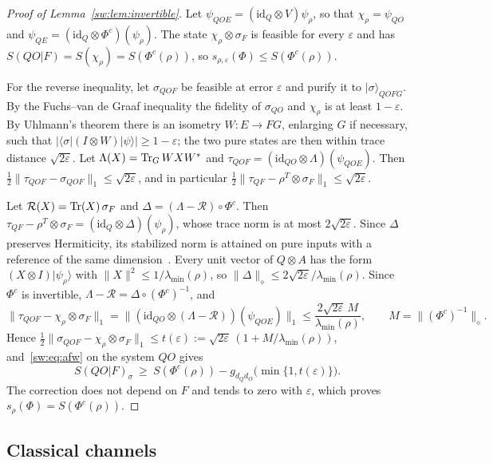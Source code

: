 \begin{proof}[Proof of Lemma~\ref{sw:lem:invertible}]
Let $\psi_{QOE}=(\mathrm{id}_Q\otimes V)\psi_\rho$, so that $\chi_\rho=\psi_{QO}$ and $\psi_{QE}=(\mathrm{id}_Q\otimes\Phi^c)(\psi_\rho)$. The state $\chi_\rho\otimes\sigma_F$ is feasible for every $\varepsilon$ and has $S(QO|F)=S(\chi_\rho)=S(\Phi^c(\rho))$, so $s_{\rho,\varepsilon}(\Phi)\le S(\Phi^c(\rho))$.

For the reverse inequality, let $\sigma_{QOF}$ be feasible at error $\varepsilon$ and purify it to $|\sigma\rangle_{QOFG}$. By the Fuchs--van de Graaf inequality the fidelity of $\sigma_{QO}$ and $\chi_\rho$ is at least $1-\varepsilon$. By Uhlmann's theorem there is an isometry $W:E\to FG$, enlarging $G$ if necessary, such that $|\langle\sigma|(I\otimes W)|\psi\rangle|\ge1-\varepsilon$; the two pure states are then within trace distance $\sqrt{2\varepsilon}$. Let $\Lambda(X)=\operatorname{Tr}_G WXW^*$ and $\tau_{QOF}=(\mathrm{id}_{QO}\otimes\Lambda)(\psi_{QOE})$. Then $\tfrac12\|\tau_{QOF}-\sigma_{QOF}\|_1\le\sqrt{2\varepsilon}$, and in particular $\tfrac12\|\tau_{QF}-\rho^T\otimes\sigma_F\|_1\le\sqrt{2\varepsilon}$.

Let $\mathcal R(X)=\operatorname{Tr}(X)\,\sigma_F$ and $\Delta=(\Lambda-\mathcal R)\circ\Phi^c$. Then $\tau_{QF}-\rho^T\otimes\sigma_F=(\mathrm{id}_Q\otimes\Delta)(\psi_\rho)$, whose trace norm is at most $2\sqrt{2\varepsilon}$. Since $\Delta$ preserves Hermiticity, its stabilized norm is attained on pure inputs with a reference of the same dimension~\cite[Thm.~3.51]{Watrous18}. Every unit vector of $Q\otimes A$ has the form $(X\otimes I)|\psi_\rho\rangle$ with $\|X\|^2\le1/\lambda_{\min}(\rho)$, so $\|\Delta\|_\diamond\le2\sqrt{2\varepsilon}/\lambda_{\min}(\rho)$. Since $\Phi^c$ is invertible, $\Lambda-\mathcal R=\Delta\circ(\Phi^c)^{-1}$, and
\[
\|\tau_{QOF}-\chi_\rho\otimes\sigma_F\|_1=\|(\mathrm{id}_{QO}\otimes(\Lambda-\mathcal R))(\psi_{QOE})\|_1\le\frac{2\sqrt{2\varepsilon}\,M}{\lambda_{\min}(\rho)},\qquad M=\|(\Phi^c)^{-1}\|_\diamond.
\]
Hence $\tfrac12\|\sigma_{QOF}-\chi_\rho\otimes\sigma_F\|_1\le t(\varepsilon):=\sqrt{2\varepsilon}\,(1+M/\lambda_{\min}(\rho))$, and~\eqref{sw:eq:afw} on the system $QO$ gives
\[
S(QO|F)_\sigma\ \ge\ S(\Phi^c(\rho))-g_{d_Qd_O}\bigl(\min\{1,t(\varepsilon)\}\bigr).
\]
The correction does not depend on $F$ and tends to zero with $\varepsilon$, which proves $s_\rho(\Phi)=S(\Phi^c(\rho))$.
\end{proof}

\subsection{Classical channels}\label{sw:app:classical}

